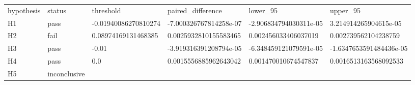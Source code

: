 \begin{tabular}{llllll}
hypothesis & status & threshold & paired_difference & lower_95 & upper_95 \\
H1 & pass & -0.01940086270810274 & -7.000326767814258e-07 & -2.906834794030311e-05 & 3.214914265904615e-05 \\
H2 & fail & 0.08974169131468385 & 0.0025932810155583465 & 0.002456033406037019 & 0.002739562104238759 \\
H3 & pass & -0.01 & -3.919316391208794e-05 & -6.348459121079591e-05 & -1.6347653591484436e-05 \\
H4 & pass & 0.0 & 0.0015556885962643042 & 0.001470010674547837 & 0.0016513163568092533 \\
H5 & inconclusive &  &  &  &  \\
\end{tabular}
